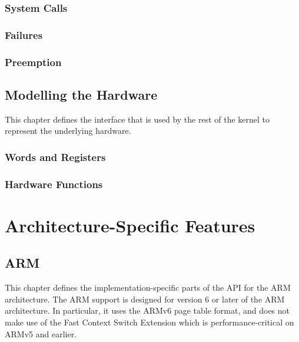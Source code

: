 \documentclass[a4paper,11pt,twoside]{report}
\begin{document}
\section{System Calls}\label{sec:model.syscall}


\section{Failures}\label{sec:model.failures}


\section{Preemption}\label{sec:model.preemption}


\chapter{Modelling the Hardware}\label{sec:machine}\label{ch:code:machine}

This chapter defines the interface that is used by the rest of the kernel to represent the underlying hardware.

\section{Words and Registers}\label{sec:machine.registerset}


\section{Hardware Functions}\label{sec:machine.hardware}


\part{Architecture-Specific Features}

\chapter{ARM}

This chapter defines the implementation-specific parts of the API for the ARM architecture. The ARM support is designed for version 6 or later of the ARM architecture. In particular, it uses the ARMv6 page table format, and does not make use of the Fast Context Switch Extension which is performance-critical on ARMv5 and earlier.
\end{document}

